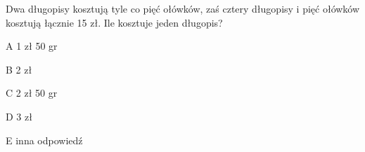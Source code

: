 \begin{tresc}
Dwa długopisy kosztują tyle co pięć ołówków, zaś cztery długopisy i pięć ołówków kosztują łącznie 15 zł. Ile kosztuje jeden długopis?
\end{tresc}
\begin{wariant}{A} 1 zł 50 gr \end{wariant}
\begin{wariant}{B} 2 zł \end{wariant}
\begin{wariant}{C} 2 zł 50 gr \end{wariant}
\begin{wariant}{D} 3 zł \end{wariant}
\begin{wariant}{E} inna odpowiedź \end{wariant}
